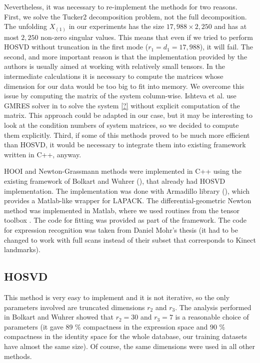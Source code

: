 Nevertheless, it was necessary to re-implement the methods
for two reasons.
First, we solve the Tucker2 decomposition problem, not the
full decomposition.  The unfolding $X_{(1)}$ in our experiments
has the size $17,988 \times 2,250$ and has at most $2,250$ 
non-zero singular values. This means that even if we tried
to perform HOSVD without truncation in the first mode ($r_1 = d_1 = 17,988$),
it will fail.
The second, and more important reason is that the implementation
provided by the authors is usually aimed at working
with relatively small tensors. In the intermediate calculations
it is necessary to compute the matrices whose
dimension for our data would be too big to fit into memory.
We overcome this issue by computing the matrix of the 
system column-wise. Ishteva et al.
use GMRES solver in \cite{IDLAVH09} to solve the system \ref{?} without
explicit computation of the matrix. This approach could
be adapted in our case, but it may be interesting
to look at the condition numbers of system matrices, 
so we decided to compute them explicitly.
Third, if some of this methods proved to be much more
efficient than HOSVD, it would be necessary to integrate 
them into existing framework written in C++, anyway.





HOOI and Newton-Grassmann methods were implemented in C++ using the existing framework 
of Bolkart and Wuhrer (\cite{bolkart_wuhrer_2013}), that already had HOSVD implementation.
The implementation was done with Armadillo library (\cite{armadillo_report}),
which provides a Matlab-like wrapper for LAPACK.
The differential-geometric Newton method was implemented in Matlab,
where we used routines from  the tensor toolbox \cite{tensor_toolbox}.
The code for fitting was provided as part of the framework. The code for 
expression recognition was taken from Daniel Mohr's thesis
(it had to be changed to work with full scans instead of their subset
that corresponds to Kinect landmarks).




\subsection{HOSVD}
This method is very easy to implement and it is not iterative,
so the only parameters involved are truncated dimensions $r_2$
and $r_3$. The analysis performed in Bolkart and Wuhrer \cite{bolkart_wuhrer_2013}
showed that $r_2 = 30$ and $r_3 = 7$ is a reasonable choice of parameters (it gave 89 \% compactness
in the expression space and $90$ \% compactness in the identity space for the whole database,
our training datasets have almost the same size). Of course, the same dimensions
were used in all other methods.

